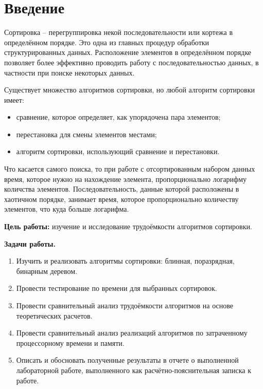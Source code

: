 \chapter*{Введение}

Сортировка -- перегруппировка некой последовательности или кортежа в определённом порядке. 
Это одна из главных процедур обработки структурированных данных. 
Расположение элементов в определённом порядке позволяет более эффективно проводить работу с последовательностью данных, в частности при поиске некоторых данных. \newline

Существует множество алгоритмов сортировки, но любой алгоритм сортировки имеет:
\begin{itemize}
	\item сравнение, которое определяет, как упорядочена пара элементов;
    \item перестановка для смены элементов местами;
    \item алгоритм сортировки, использующий сравнение и перестановки. \newline
\end{itemize}

Что касается самого поиска, то при работе с отсортированным набором данных время, которое нужно на нахождение элемента, пропорционально логарифму количства элементов. Последовательность, данные которой расположены в хаотичном порядке, занимает время, которое пропорционально количеству элементов, что куда больше логарифма. \newline

\textbf{Цель работы:} изучение и исследование трудоёмкости алгоритмов сортировки. \newline

\textbf{Задачи работы.}
\begin{enumerate}
	\item Изучить и реализовать алгоритмы сортировки: блинная, поразрядная, бинарным деревом.
    \item Провести тестирование по времени для выбранных сортировок.
    \item Провести сравнительный анализ трудоёмкости алгоритмов на основе теоретических расчетов.
    \item Провести сравнительный анализ реализаций алгоритмов по затраченному процессорному времени и памяти.
	\item Описать и обосновать полученные результаты в отчете о выполненной лабораторной работе, выполненного как расчётно-пояснительная записка к работе.
\end{enumerate}